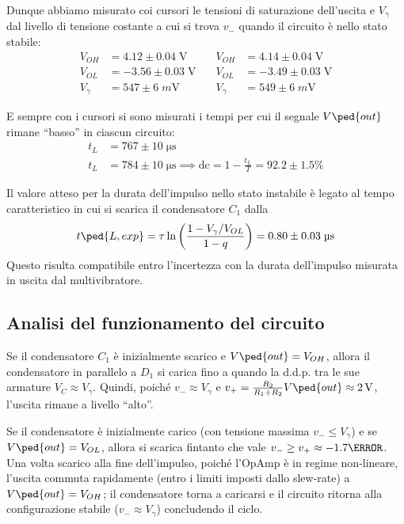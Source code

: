 \documentclass[10pt, a4paper, italian]{article}
\begin{document}
Dunque abbiamo misurato coi cursori le tensioni di saturazione dell'uscita e 
$V_\gamma$ dal livello di tensione costante a cui si trova $v_-$ quando il
circuito è nello stato stabile:
\begin{align*}
V_{OH} &= 4.12 \pm 0.04 \; \si{\V} \quad &V_{OH} &= 4.14 \pm 0.04 \; \si{\V} \\
V_{OL} &= -3.56 \pm 0.03 \; \si{\V} \quad &V_{OL} &= -3.49 \pm 0.03 \; \si{\V} \\
V_{\gamma} &= 547 \pm 6 \; \si{m\V} \quad &V_{\gamma} &= 549 \pm 6 \; \si{m\V}
\end{align*}

E sempre con i cursori si sono misurati i tempi per cui il segnale $V\ped{out}$
rimane ``basso'' in ciascun circuito:
\begin{align*}
t_L &= 767 \pm 10 \;\si{\micro\s} \\
t_L &= 784 \pm 10 \;\si{\micro\s}
\implies \mathrm{dc} = 1 - \frac{t_L}{T} = 92.2 \pm 1.5 \% 
\end{align*}

Il valore atteso per la durata dell'impulso nello stato instabile è legato
al tempo caratteristico in cui si scarica il condensatore $C_1$ dalla
\begin{equation}\label{eq: mstable_Delta}
t\ped{L, exp} = \tau \ln{\left(\frac{1 - V_\gamma/V_{OL}}{1 - q}\right)} =
0.80 \pm 0.03 \; \si{\micro\s}
\end{equation}
Questo risulta compatibile entro l'incertezza con la durata dell'impulso
misurata in uscita dal multivibratore.

\subsection{Analisi del funzionamento del circuito}
Se il condensatore $C_1$ è inizialmente scarico e $V\ped{out} = V_{OH}$, allora
il condensatore in parallelo a $D_1$ si carica fino a quando la d.d.p. tra le
sue armature $V_C \approx V_{\gamma}$. Quindi, poiché $v_- \approx V_{\gamma}$
e $v_+ = \frac{R_{2}}{R_{1} + R_{2}} V\ped{out} \approx \SI{2}{V}$, l'uscita
rimane a livello ``alto''.

Se il condensatore è inizialmente carico (con tensione massima
$v_- \leq V_\gamma$) e se $V\ped{out} = V_{OL}$, allora si scarica fintanto
che vale $v_- \geq v_+ \approx - 1.7 {\V}$. Una volta scarico alla fine
dell'impulso, poiché l'OpAmp è in regime non-lineare, l'uscita commuta
rapidamente (entro i limiti imposti dallo slew-rate) a $V\ped{out} = V_{OH}$;
il condensatore torna a caricarsi e il circuito ritorna alla configurazione
stabile ($v_- \approx V_\gamma$) concludendo il ciclo.
\end{document}
